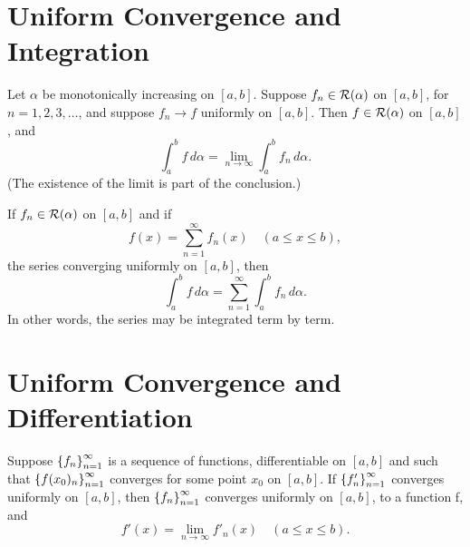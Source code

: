 \section{Uniform Convergence and Integration}
\label{sec:chap7:uniform_conv_integration}

\begin{theorem} %
  \label{thm:chap7:uniform_conv_integral}
  Let $\alpha$ be monotonically increasing on $[a, b]$. Suppose $f_n
  \in \mathcal{R}(\alpha)$ on $[a, b]$, for $n=1, 2, 3, \dots$, and
  suppose $f_n \to f$ uniformly on $[a, b]$. Then $f \in
  \mathcal{R}(\alpha)$ on $[a, b]$, and
  \begin{equation} \label{eq:chap7:integral_limit_result}
    \int_a^b f \, d\alpha = \lim_{n \to \infty} \int_a^b f_n \, d\alpha.
  \end{equation}
  (The existence of the limit is part of the conclusion.)
\end{theorem}

\begin{corollary} %
  \label{cor:chap7:term_by_term_integration}
  If $f_n \in \mathcal{R}(\alpha)$ on $[a, b]$ and if
  \[ f(x) = \sum_{n=1}^\infty f_n(x) \quad (a \le x \le b), \]
  the series converging uniformly on $[a, b]$, then
  \[ \int_a^b f \, d\alpha = \sum_{n=1}^\infty \int_a^b f_n \, d\alpha. \]
  In other words, the series may be integrated term by term.
\end{corollary}



\section{Uniform Convergence and Differentiation}
\label{sec:chap7:uniform_conv_differentiation}


\begin{theorem} %
  \label{thm:chap7:limit_differentiation}
  Suppose $\left\{ f_n \right\}_{n=1}^\infty$ is a sequence of functions, differentiable
  on $[a, b]$ and such that $\left\{ f(x_0)_n \right\}_{n=1}^\infty$ converges for some
  point $x_0$ on $[a, b]$. If $\left\{ f'_n \right\}_{n=1}^\infty$ converges uniformly on
  $[a, b]$, then $\left\{ f_n \right\}_{n=1}^\infty$ converges uniformly on $[a, b]$, to a
  function f, and
  \begin{equation} \label{eq:chap7:deriv_limit_result}
    f'(x) = \lim_{n \to \infty} f'_n(x) \quad (a \le x \le b).
  \end{equation}
\end{theorem}

